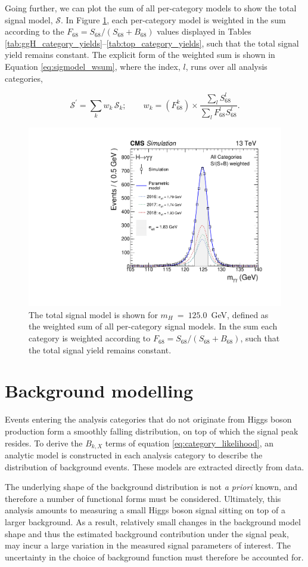 Going further, we can plot the sum of all per-category models to show the total signal model, $\mathcal{S}$. In Figure \ref{fig:sigmodels_weighted}, each per-category model is weighted in the sum according to the $F_{68} = S_{68}/(S_{68}+B_{68})$ values displayed in Tables \ref{tab:ggH_category_yields}--\ref{tab:top_category_yields}, such that the total signal yield remains constant. The explicit form of the weighted sum is shown in Equation \ref{eq:sigmodel_wsum}, where the index, $l$, runs over all analysis categories,

\begin{equation}\label{eq:sigmodel_wsum}
    \mathcal{S}^' = \sum_k w_k\,\mathcal{S}_k; \qquad w_k = (F^k_{68}) \times \frac{\sum_l S^l_{68}}{\sum_l F^l_{68} S^l_{68}}.
\end{equation}

\begin{figure}[hbtp]
  \centering
  \includegraphics[width=.45\textwidth]{Figures/hgg_stats/smodel_all_weight.pdf}
  \caption[Weighted sum of all signal models]
  {
    The total signal model is shown for $m_H~=~125.0$~GeV, defined as the weighted sum of all per-category signal models. In the sum each category is weighted according to $F_{68}=S_{68}/(S_{68}+B_{68})$, such that the total signal yield remains constant.
  }
  \label{fig:sigmodels_weighted}
\end{figure}

\newpage
\section{Background modelling}\label{sec:bkg_modeling}
Events entering the analysis categories that do not originate from Higgs boson production form a smoothly falling \mgg distribution, on top of which the signal peak resides. To derive the $B_{k,X}$ terms of equation \ref{eq:category_likelihood}, an analytic model is constructed in each analysis category to describe the distribution of background events. These models are extracted directly from data.

The underlying shape of the background distribution is not \textit{a priori} known, and therefore a number of functional forms must be considered. Ultimately, this analysis amounts to measuring a small Higgs boson signal sitting on top of a larger background. As a result, relatively small changes in the background model shape and thus the estimated background contribution under the signal peak, may incur a large variation in the measured signal parameters of interest. The uncertainty in the choice of background function must therefore be accounted for.

